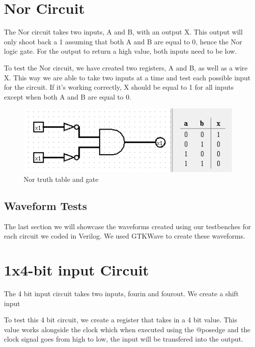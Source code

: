\documentclass[12pt]{article}
\begin{document}
\section{Nor Circuit}
The Nor circuit takes two inputs, A and B, with an output X. This output will only shoot back a 1 assuming that both A and B are equal to 0, hence the Nor logic gate. For the output to return a high value, both inputs need to be low.


To test the Nor circuit, we have created two registers, A and B, as well as a wire X. This way we are able to take two inputs at a time and test each possible input for the circuit. If it's working correctly, X should be equal to 1 for all inputs except when both A and B are equal to 0. 


\begin{figure}[h]
    \centering
    \includegraphics[width = 1.0\textwidth]{figs/Nor CircuitTruth.png}
    \caption{Nor truth table and gate}
    \label{fig:enter-label}
\end{figure}

\newpage

\subsection{Waveform Tests}

The last section we will showcase the waveforms created using our testbenches for each circuit we coded in Verilog. We used GTKWave to create these waveforms.





\section{1x4-bit input Circuit}
The 4 bit input circuit takes two inputs, fourin and fourout. We create a shift input 

To test this 4 bit circuit, we create a register that takes in a 4 bit value. This value works alongside the clock which when executed using the @posedge and the clock signal goes from high to low, the input will be transfered into the output.
\end{document}

